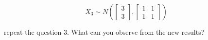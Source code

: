 \begin{enumerate}
    \begin{equation*}
        X_3 \sim N\left( \begin{bmatrix} 3 \\ 3 \end{bmatrix}, \begin{bmatrix} 1 & 1 \\ 1 & 1 \end{bmatrix} \right)
    \end{equation*}
    
    \noindent repeat the question 3. What can you observe from the new results?
    
\end{enumerate}



